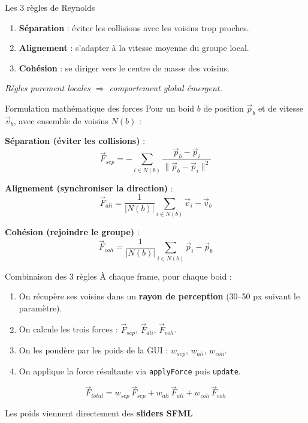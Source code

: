 \documentclass[aspectratio=169]{beamer}
\begin{document}

\begin{frame}{Les 3 règles de Reynolds}
  \begin{enumerate}
    \setlength\itemsep{0.7em}
    \item \textbf{Séparation} : éviter les collisions avec les voisins trop proches.
    \item \textbf{Alignement} : s'adapter à la vitesse moyenne du groupe local.
    \item \textbf{Cohésion} : se diriger vers le centre de masse des voisins.
  \end{enumerate}
  \vspace{0.5cm}
  \centering
  \textit{Règles purement locales $\Rightarrow$ comportement global émergent.}
\end{frame}

\begin{frame}{Formulation mathématique des forces}
  Pour un boid $b$ de position $\vec{p}_b$ et de vitesse $\vec{v}_b$, avec ensemble de voisins $N(b)$ :

  \vspace{0.3cm}
  \textbf{Séparation (éviter les collisions)} :
  \[
    \vec{F}_{sep} = - \sum_{i \in N(b)} \frac{\vec{p}_b - \vec{p}_i}{\|\vec{p}_b - \vec{p}_i\|^2}
  \]

  \textbf{Alignement (synchroniser la direction)} :
  \[
    \vec{F}_{ali} = \frac{1}{|N(b)|}\sum_{i \in N(b)} \vec{v}_i - \vec{v}_b
  \]

  \textbf{Cohésion (rejoindre le groupe)} :
  \[
    \vec{F}_{coh} = \frac{1}{|N(b)|}\sum_{i \in N(b)} \vec{p}_i - \vec{p}_b
  \]
\end{frame}

\begin{frame}{Combinaison des 3 règles}
  À chaque frame, pour chaque boid :
  \begin{enumerate}
    \item On récupère ses voisins dans un \textbf{rayon de perception} (30–50 px suivant le paramètre).
    \item On calcule les trois forces : $\vec{F}_{sep}$, $\vec{F}_{ali}$, $\vec{F}_{coh}$.
    \item On les pondère par les poids de la GUI : $w_{sep}$, $w_{ali}$, $w_{coh}$.
    \item On applique la force résultante via \texttt{applyForce} puis \texttt{update}.
  \end{enumerate}

  \[
    \vec{F}_{total} =
    w_{sep}\,\vec{F}_{sep} +
    w_{ali}\,\vec{F}_{ali} +
    w_{coh}\,\vec{F}_{coh}
  \]

  \vspace{0.1cm}
  Les poids viennent directement des \textbf{sliders SFML} 
\end{frame}
\end{document}
